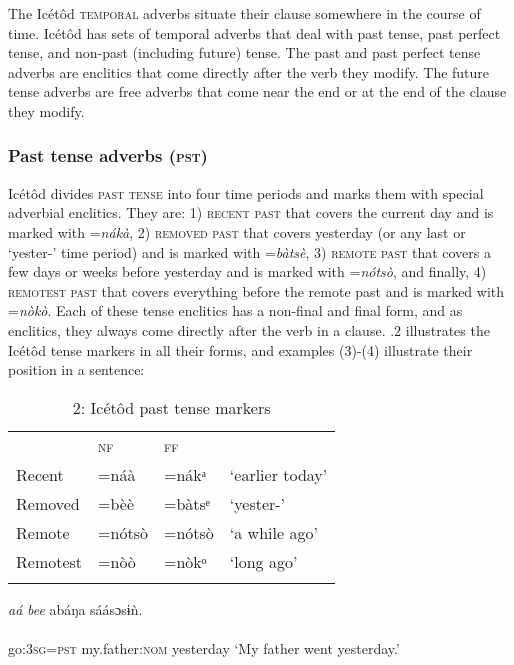 The Icétôd \textsc{temporal} adverbs situate their clause somewhere in the course of time. Icétôd has sets of temporal adverbs that deal with past tense, past perfect tense, and non-past (including future) tense. The past and past perfect tense adverbs are enclitics that come directly after the verb they modify. The future tense adverbs are free adverbs that come near the end or at the end of the clause they modify. 


\subsubsection{Past tense adverbs (\textsc{pst})}

Icétôd divides \textsc{past tense} into four time periods and marks them with special adverbial enclitics. They are: 1) \textsc{recent past} that covers the current day and is marked with =\textit{nákà}, 2) \textsc{removed past} that covers yesterday (or any last or ‘yester-’ time period) and is marked with =\textit{bàtsè}, 3) \textsc{remote past} that covers a few days or weeks before yesterday and is marked with =\textit{nótsò}, and finally, 4) \textsc{remotest past} that covers everything before the remote past and is marked with =\textit{nòkò}. Each of these tense enclitics has a non-final and final form, and as enclitics, they always come directly after the verb in a clause. .2 illustrates the Icétôd tense markers in all their forms, and examples (3)-(4) illustrate their position in a sentence:


\begin{table}
\caption{2: Icétôd past tense markers}
\label{tab:9}


\begin{tabularx}{\textwidth}{XXXX} & \textsc{nf} & \textsc{ff} & \\
\lsptoprule
Recent & =náà & =nákᵃ & ‘earlier today’\\
Removed & =bèè & =bàtsᵉ & ‘yester-’\\
Remote & =nótsò & =nótsò & ‘a while ago’\\
Remotest & =nòò & =nòkᵒ & ‘long ago’\\
\lspbottomrule
\end{tabularx}
\end{table}



\ea\label{ex:}
\textit{aá} \textit{bee}   abáŋa     sáásɔsɨǹ. \\
    \\
go:\textsc{3sg}=\textsc{pst}   my.father:\textsc{nom}   yesterday
\glt ‘My father went yesterday.’ 
\z





